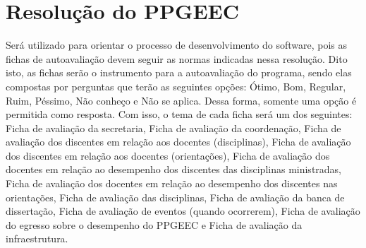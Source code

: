     \section{Resolução do PPGEEC}
    \label{sec:reactjs}
        Será utilizado para orientar o processo de desenvolvimento do software, pois as fichas de autoavaliação devem seguir as normas indicadas nessa resolução. Dito isto, as fichas serão o instrumento para a autoavaliação do programa, sendo elas compostas por perguntas que terão as seguintes opções: Ótimo, Bom, Regular, Ruim, Péssimo, Não conheço e Não se aplica. Dessa forma, somente uma opção é permitida como resposta. Com isso, o tema de cada ficha será um dos seguintes: Ficha de avaliação da secretaria, Ficha de avaliação da coordenação, Ficha de avaliação dos discentes em relação aos docentes (disciplinas), Ficha de avaliação dos discentes em relação aos docentes (orientações), Ficha de avaliação dos docentes em relação ao desempenho dos discentes das disciplinas ministradas,
        Ficha de avaliação dos docentes em relação ao desempenho dos discentes nas orientações, Ficha de avaliação das disciplinas,
        Ficha de avaliação da banca de dissertação, Ficha de avaliação de eventos (quando ocorrerem),
        Ficha de avaliação do egresso sobre o desempenho do PPGEEC e Ficha de avaliação da infraestrutura.